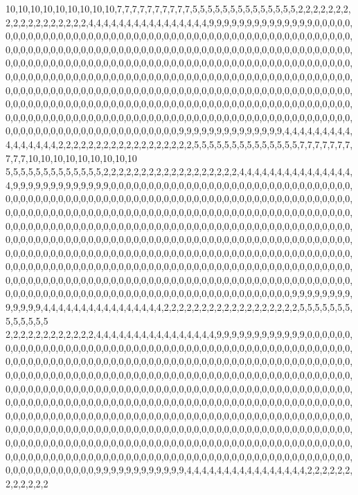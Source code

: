 10,10,10,10,10,10,10,10,10,7,7,7,7,7,7,7,7,7,7,5,5,5,5,5,5,5,5,5,5,5,5,5,5,2,2,2,2,2,2,2,2,2,2,2,2,2,2,2,2,2,2,4,4,4,4,4,4,4,4,4,4,4,4,4,4,4,4,9,9,9,9,9,9,9,9,9,9,9,9,9,9,0,0,0,0,0,0,0,0,0,0,0,0,0,0,0,0,0,0,0,0,0,0,0,0,0,0,0,0,0,0,0,0,0,0,0,0,0,0,0,0,0,0,0,0,0,0,0,0,0,0,0,0,0,0,0,0,0,0,0,0,0,0,0,0,0,0,0,0,0,0,0,0,0,0,0,0,0,0,0,0,0,0,0,0,0,0,0,0,0,0,0,0,0,0,0,0,0,0,0,0,0,0,0,0,0,0,0,0,0,0,0,0,0,0,0,0,0,0,0,0,0,0,0,0,0,0,0,0,0,0,0,0,0,0,0,0,0,0,0,0,0,0,0,0,0,0,0,0,0,0,0,0,0,0,0,0,0,0,0,0,0,0,0,0,0,0,0,0,0,0,0,0,0,0,0,0,0,0,0,0,0,0,0,0,0,0,0,0,0,0,0,0,0,0,0,0,0,0,0,0,0,0,0,0,0,0,0,0,0,0,0,0,0,0,0,0,0,0,0,0,0,0,0,0,0,0,0,0,0,0,0,0,0,0,0,0,0,0,0,0,0,0,0,0,0,0,0,0,0,0,0,0,0,0,0,0,0,0,0,0,0,0,0,0,0,0,0,0,0,0,0,0,0,0,0,0,0,0,0,0,0,0,0,0,0,0,0,0,0,0,0,0,0,0,0,0,0,0,0,0,0,0,0,0,0,0,0,0,0,0,0,0,0,0,0,0,0,0,0,0,0,0,0,0,0,0,0,0,0,0,0,0,0,0,0,0,0,0,0,0,0,0,0,0,0,0,0,0,0,0,9,9,9,9,9,9,9,9,9,9,9,9,9,9,4,4,4,4,4,4,4,4,4,4,4,4,4,4,4,4,2,2,2,2,2,2,2,2,2,2,2,2,2,2,2,2,2,2,5,5,5,5,5,5,5,5,5,5,5,5,5,5,7,7,7,7,7,7,7,7,7,7,10,10,10,10,10,10,10,10,10
5,5,5,5,5,5,5,5,5,5,5,5,5,2,2,2,2,2,2,2,2,2,2,2,2,2,2,2,2,2,2,4,4,4,4,4,4,4,4,4,4,4,4,4,4,4,4,9,9,9,9,9,9,9,9,9,9,9,9,9,0,0,0,0,0,0,0,0,0,0,0,0,0,0,0,0,0,0,0,0,0,0,0,0,0,0,0,0,0,0,0,0,0,0,0,0,0,0,0,0,0,0,0,0,0,0,0,0,0,0,0,0,0,0,0,0,0,0,0,0,0,0,0,0,0,0,0,0,0,0,0,0,0,0,0,0,0,0,0,0,0,0,0,0,0,0,0,0,0,0,0,0,0,0,0,0,0,0,0,0,0,0,0,0,0,0,0,0,0,0,0,0,0,0,0,0,0,0,0,0,0,0,0,0,0,0,0,0,0,0,0,0,0,0,0,0,0,0,0,0,0,0,0,0,0,0,0,0,0,0,0,0,0,0,0,0,0,0,0,0,0,0,0,0,0,0,0,0,0,0,0,0,0,0,0,0,0,0,0,0,0,0,0,0,0,0,0,0,0,0,0,0,0,0,0,0,0,0,0,0,0,0,0,0,0,0,0,0,0,0,0,0,0,0,0,0,0,0,0,0,0,0,0,0,0,0,0,0,0,0,0,0,0,0,0,0,0,0,0,0,0,0,0,0,0,0,0,0,0,0,0,0,0,0,0,0,0,0,0,0,0,0,0,0,0,0,0,0,0,0,0,0,0,0,0,0,0,0,0,0,0,0,0,0,0,0,0,0,0,0,0,0,0,0,0,0,0,0,0,0,0,0,0,0,0,0,0,0,0,0,0,0,0,0,0,0,0,0,0,0,0,0,0,0,0,0,0,0,0,0,0,0,0,0,0,0,0,0,0,0,0,0,0,0,0,0,0,0,0,0,0,0,0,0,0,0,0,0,0,0,0,0,0,0,0,0,0,0,0,0,0,0,0,0,0,0,0,0,0,0,0,0,0,0,0,0,0,0,0,0,0,0,9,9,9,9,9,9,9,9,9,9,9,9,9,4,4,4,4,4,4,4,4,4,4,4,4,4,4,4,4,2,2,2,2,2,2,2,2,2,2,2,2,2,2,2,2,2,2,5,5,5,5,5,5,5,5,5,5,5,5,5
2,2,2,2,2,2,2,2,2,2,2,2,4,4,4,4,4,4,4,4,4,4,4,4,4,4,4,4,9,9,9,9,9,9,9,9,9,9,9,9,0,0,0,0,0,0,0,0,0,0,0,0,0,0,0,0,0,0,0,0,0,0,0,0,0,0,0,0,0,0,0,0,0,0,0,0,0,0,0,0,0,0,0,0,0,0,0,0,0,0,0,0,0,0,0,0,0,0,0,0,0,0,0,0,0,0,0,0,0,0,0,0,0,0,0,0,0,0,0,0,0,0,0,0,0,0,0,0,0,0,0,0,0,0,0,0,0,0,0,0,0,0,0,0,0,0,0,0,0,0,0,0,0,0,0,0,0,0,0,0,0,0,0,0,0,0,0,0,0,0,0,0,0,0,0,0,0,0,0,0,0,0,0,0,0,0,0,0,0,0,0,0,0,0,0,0,0,0,0,0,0,0,0,0,0,0,0,0,0,0,0,0,0,0,0,0,0,0,0,0,0,0,0,0,0,0,0,0,0,0,0,0,0,0,0,0,0,0,0,0,0,0,0,0,0,0,0,0,0,0,0,0,0,0,0,0,0,0,0,0,0,0,0,0,0,0,0,0,0,0,0,0,0,0,0,0,0,0,0,0,0,0,0,0,0,0,0,0,0,0,0,0,0,0,0,0,0,0,0,0,0,0,0,0,0,0,0,0,0,0,0,0,0,0,0,0,0,0,0,0,0,0,0,0,0,0,0,0,0,0,0,0,0,0,0,0,0,0,0,0,0,0,0,0,0,0,0,0,0,0,0,0,0,0,0,0,0,0,0,0,0,0,0,0,0,0,0,0,0,0,0,0,0,0,0,0,0,0,0,0,0,0,0,0,0,0,0,0,0,0,0,0,0,0,0,0,0,0,0,0,0,0,0,0,0,0,0,0,0,0,0,0,0,0,0,0,0,0,0,0,0,0,0,0,0,0,0,0,0,0,0,0,0,0,0,0,0,0,0,0,0,0,0,0,0,0,0,0,0,0,0,0,0,0,0,0,0,0,0,0,0,0,0,0,0,0,0,0,0,0,0,0,9,9,9,9,9,9,9,9,9,9,9,9,4,4,4,4,4,4,4,4,4,4,4,4,4,4,4,4,2,2,2,2,2,2,2,2,2,2,2,2
